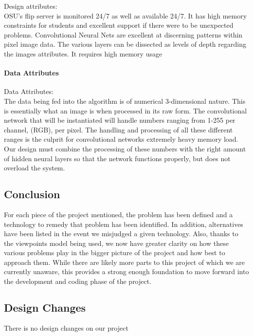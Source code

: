 \documentclass[article, onecolumn, draftclsnofoot,10pt, compsoc]{IEEEtran}
\begin{document}
	Design attributes:\\
	OSU’s flip server is monitored 24/7 as well as available 24/7. It has high memory constraints for students and excellent support if there were to be unexpected problems. Convolutional Neural Nets are excellent at discerning patterns within pixel image data. The various layers can be dissected as levels of depth regarding the images attributes. It requires high memory usage\\

\paragraph{Data Attributes}
Data Attributes:\\
	The data being fed into the algorithm is of numerical 3-dimensional nature. This is essentially what an image is when processed in its raw form. The convolutional network that will be instantiated will handle numbers ranging from 1-255 per channel, (RGB), per pixel. The handling and processing of all these different ranges is the culprit for convolutional networks extremely heavy memory load. Our design must combine the processing of these numbers with the right amount of hidden neural layers so that the network functions properly, but does not overload the system.\\


\subsection{Conclusion}
For each piece of the project mentioned, the problem has been defined and a technology to remedy that problem has been identified. In addition, alternatives have been listed in the event we misjudged a given technology. Also, thanks to the viewpoints model being used, we now have greater clarity on how these various problems play in the bigger picture of the project and how best to approach them. While there are likely more parts to this project of which we are currently unaware, this provides a strong enough foundation to move forward into the development and coding phase of the project.

\subsection{Design Changes}
There is no design changes on our project
\end{document}
